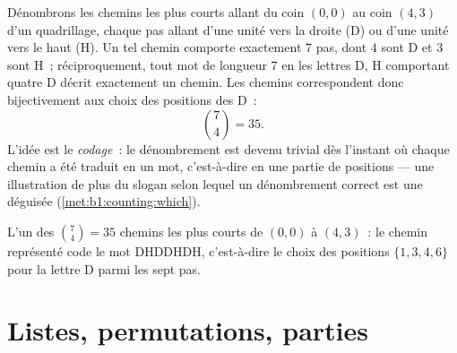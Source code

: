 \begin{example}\label{ex:b1:counting:paths}
Dénombrons les chemins les plus courts allant du coin $(0,0)$ au coin
$(4, 3)$ d'un quadrillage, chaque pas allant d'une unité vers la
droite (D) ou d'une unité vers le haut (H). Un tel chemin comporte
exactement $7$ pas, dont $4$ sont D et $3$ sont H~; réciproquement,
tout mot de longueur $7$ en les lettres D, H comportant quatre D
décrit exactement un chemin. Les chemins correspondent donc
bijectivement aux choix des positions des D~:
\[
\binom{7}{4} = 35 .
\]
L'idée est le \emph{codage}~: le dénombrement est devenu trivial dès
l'instant où chaque chemin a été traduit en un mot, c'est-à-dire en
une partie de positions --- une illustration de plus du slogan selon
lequel un dénombrement correct est une  déguisée
(\cref{met:b1:counting:which}).
\end{example}

\begin{omfigure}

{\small L'un des $\binom74 = 35$ chemins les plus courts de $(0,0)$ à
$(4,3)$~: le chemin représenté code le mot DHDDHDH, c'est-à-dire le
choix des positions $\{1,3,4,6\}$ pour la lettre D parmi les sept
pas.}
\end{omfigure}

\section{Listes, permutations, parties}

